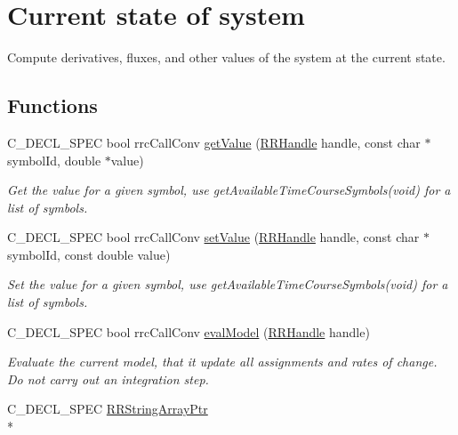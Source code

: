 \hypertarget{group__state}{\section{Current state of system}
\label{group__state}
}


Compute derivatives, fluxes, and other values of the system at the current state.  


\subsection*{Functions}
\begin{DoxyCompactItemize}
\item 
C\-\_\-\-D\-E\-C\-L\-\_\-\-S\-P\-E\-C bool rrc\-Call\-Conv \hyperlink{group__state_ga6ff35b4282c583424f4d5708330012b9}{get\-Value} (\hyperlink{rrc__types_8h_a1d68f0592372208fa5a5f2799ea4b3ae}{R\-R\-Handle} handle, const char $\ast$symbol\-Id, double $\ast$value)
\begin{DoxyCompactList}\small\item\em Get the value for a given symbol, use get\-Available\-Time\-Course\-Symbols(void) for a list of symbols. \end{DoxyCompactList}\item 
C\-\_\-\-D\-E\-C\-L\-\_\-\-S\-P\-E\-C bool rrc\-Call\-Conv \hyperlink{group__state_gab8416894a99ef18924c1a719be4521f3}{set\-Value} (\hyperlink{rrc__types_8h_a1d68f0592372208fa5a5f2799ea4b3ae}{R\-R\-Handle} handle, const char $\ast$symbol\-Id, const double value)
\begin{DoxyCompactList}\small\item\em Set the value for a given symbol, use get\-Available\-Time\-Course\-Symbols(void) for a list of symbols. \end{DoxyCompactList}\item 
C\-\_\-\-D\-E\-C\-L\-\_\-\-S\-P\-E\-C bool rrc\-Call\-Conv \hyperlink{group__state_ga045d3842446954ba06e4010e19a2f1b1}{eval\-Model} (\hyperlink{rrc__types_8h_a1d68f0592372208fa5a5f2799ea4b3ae}{R\-R\-Handle} handle)
\begin{DoxyCompactList}\small\item\em Evaluate the current model, that it update all assignments and rates of change. Do not carry out an integration step. \end{DoxyCompactList}\item 
C\-\_\-\-D\-E\-C\-L\-\_\-\-S\-P\-E\-C \hyperlink{rrc__types_8h_a7c9475df6c7337d99482b13a365e7596}{R\-R\-String\-Array\-Ptr} \\*

\end{DoxyCompactItemize}
